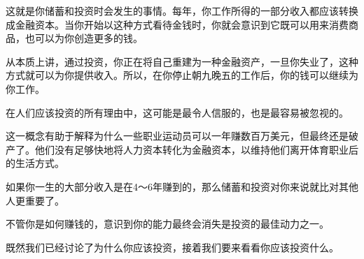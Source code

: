 这就是你储蓄和投资时会发生的事情。每年，你工作所得的一部分收入都应该转换成金融资本。当你开始以这种方式看待金钱时，你就会意识到它既可以用来消费商品，也可以为你创造更多的钱。

从本质上讲，通过投资，你正在将自己重建为一种金融资产，一旦你失业了，这种方式就可以为你提供收入。所以，在你停止朝九晚五的工作后，你的钱可以继续为你工作。

在人们应该投资的所有理由中，这可能是最令人信服的，也是最容易被忽视的。

这一概念有助于解释为什么一些职业运动员可以一年赚数百万美元，但最终还是破产了。他们没有足够快地将人力资本转化为金融资本，以维持他们离开体育职业后的生活方式。

如果你一生的大部分收入是在4～6年赚到的，那么储蓄和投资对你来说就比对其他人更重要了。

不管你是如何赚钱的，意识到你的能力最终会消失是投资的最佳动力之一。

既然我们已经讨论了为什么你应该投资，接着我们要来看看你应该投资什么。

